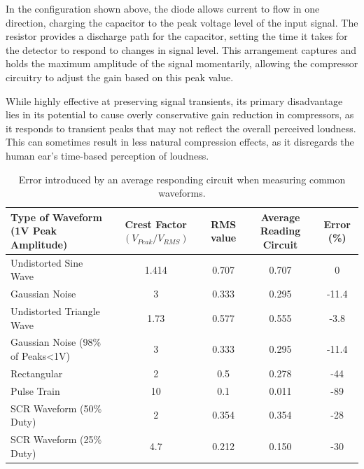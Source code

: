 \documentclass[10pt]{article}
\begin{document}
\begin{multicols*}{2}
                    \vspace{2ex}

                    \noindent In the configuration shown above, the diode allows current to flow in one direction, charging the capacitor to the peak voltage level of the input signal. The resistor provides a discharge path for the capacitor, setting the time it takes for the detector to respond to changes in signal level. This arrangement captures and holds the maximum amplitude of the signal momentarily, allowing the compressor circuitry to adjust the gain based on this peak value.\par

                    While highly effective at preserving signal transients, its primary disadvantage lies in its potential to cause overly conservative gain reduction in compressors, as it responds to transient peaks that may not reflect the overall perceived loudness. This can sometimes result in less natural compression effects, as it disregards the human ear's time-based perception of loudness.  
                    

                \begin{table}[!th]
                    \centering
                    \begin{tabularx}{\textwidth}{|l*{4}{|C}|}
                        \hline
                        Type of Waveform (1V Peak Amplitude) & Crest Factor $(V_{Peak}/V_{RMS})$ & RMS value & Average Reading Circuit & Error (\%) \\ \hline
                        Undistorted Sine Wave & 1.414 & 0.707 & 0.707 & 0 \\    \hline
                        Gaussian Noise & 3 & 0.333 & 0.295 & -11.4 \\   \hline
                        Undistorted Triangle Wave & 1.73 & 0.577 & 0.555 & -3.8 \\   \hline
                        Gaussian Noise (98\% of Peaks<1V) & 3 & 0.333 & 0.295 & -11.4 \\    \hline
                        Rectangular & 2 & 0.5 & 0.278 & -44 \\    \hline
                        Pulse Train & 10 & 0.1 & 0.011 & -89 \\    \hline
                        SCR Waveform (50\% Duty) & 2 & 0.354 & 0.354 & -28 \\    \hline
                        SCR Waveform (25\% Duty) & 4.7 & 0.212 & 0.150 & -30 \\    \hline
                    \end{tabularx}
                    \caption{Error introduced by an average responding circuit when measuring common waveforms.}
                    \label{table:ave-err}
                \end{table}


\end{multicols*}
\end{document}
